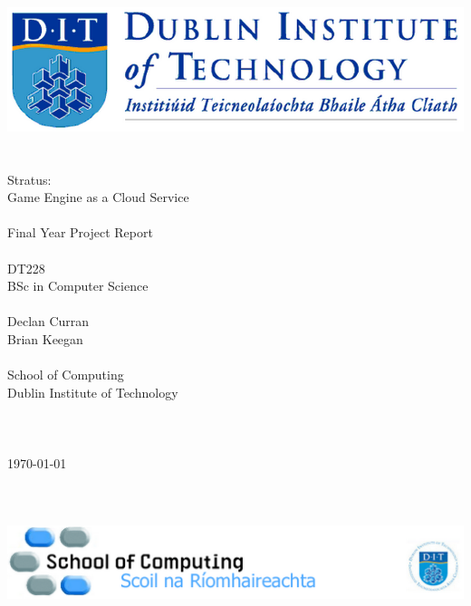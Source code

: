 \documentclass[a4paper, 12pt]{report}
\begin{document}
\begin{titlingpage}
	\centering
	\includegraphics[scale=0.5]{titleheader}\\
	~\\
	~\\
	\huge
	Stratus:\\
	Game Engine as a Cloud Service\\
	~\\
	Final Year Project Report\\
	~\\
	\LARGE
	DT228\\
	BSc in Computer Science\\
	~\\
	\large
	Declan Curran\\
	\normalsize
	Brian Keegan\\
	~\\
	School of Computing\\
	Dublin Institute of Technology\\
	~\\
	~\\
	~\\
	\today
	~\\
	~\\
	~\\
	~\\
	\includegraphics[scale=0.5]{titlefooter}
\end{titlingpage}




\setcounter{tocdepth}{2}
\tableofcontents
\listoftables
\listoffigures
\newpage










{}

\newpage

\begin{appendices}
\end{appendices}
\end{document}

